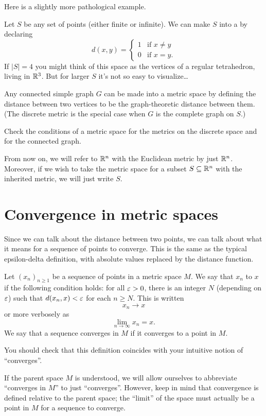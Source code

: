 Here is a slightly more pathological example.
\begin{example}
	Let $S$ be any set of points (either finite or infinite).
	We can make $S$ into a  by declaring
	\[
		d(x,y)
		=
		\begin{cases}
			1 & \text{if $x \neq y$} \\
			0 & \text{if $x = y$}.
		\end{cases}
	\]
	If $\left\lvert S \right\rvert = 4$ you might think of this space
	as the vertices of a regular tetrahedron, living in $\mathbb R^3$.
	But for larger $S$ it's not so easy to visualize\dots
\end{example}
\begin{example}
	Any connected simple graph $G$ can be made into a metric space
	by defining the distance between two vertices to be the
	graph-theoretic distance between them.
	(The discrete metric is the special case when $G$ is the complete graph on $S$.)
\end{example}
\begin{ques}
	Check the conditions of a metric space for the metrics on the discrete space
	and for the connected graph.
\end{ques}

\begin{abuse}
	From now on, we will refer to $\mathbb R^n$ with the Euclidean metric
	by just $\mathbb R^n$.
	Moreover, if we wish to take the metric space for a subset $S \subseteq \mathbb R^n$
	with the inherited metric, we will just write $S$.
\end{abuse}

\section{Convergence in metric spaces}

Since we can talk about the distance between two points, we can talk about what it means for a sequence of points to converge.
This is the same as the typical epsilon-delta definition, with absolute values replaced by the distance function.

\begin{definition}
	Let $(x_n)_{n \ge 1}$ be a sequence of points in a metric space $M$.
	We say that $x_n$  to $x$ if the following condition holds:
	for all $\varepsilon > 0$, there is an integer $N$ (depending on $\varepsilon$)
	such that $d(x_n, x) < \varepsilon$ for each $n \ge N$.
	This is written \[ x_n \to x \] or more verbosely as \[ \lim_{n \to \infty} x_n = x. \]
	We say that a sequence converges in $M$ if it converges to a point in $M$.
\end{definition}
You should check that this definition coincides with your intuitive notion of ``converges''.
\begin{abuse}
	If the parent space $M$ is understood, we will allow ourselves
	to abbreviate ``converges in $M$'' to just ``converges''.
	However, keep in mind that convergence is defined relative to the parent space;
	the ``limit'' of the space must actually be a point in $M$ for a sequence to converge.
\end{abuse}


